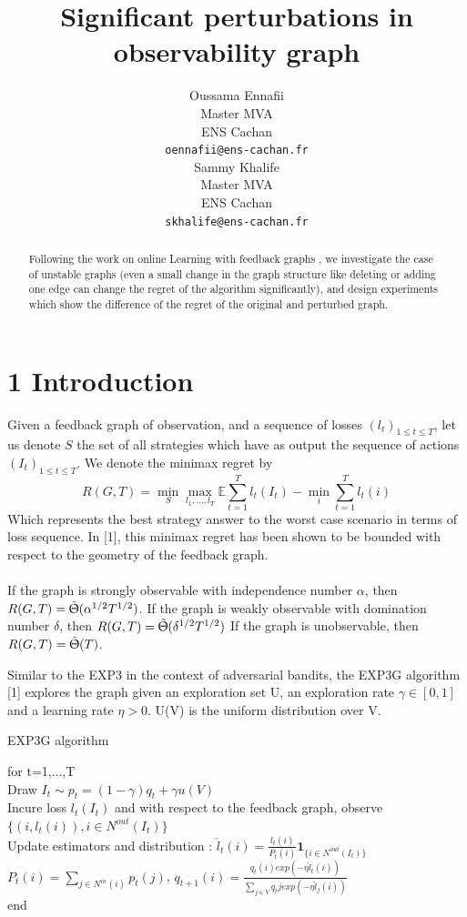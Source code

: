 \documentclass{article} %
\title{Significant perturbations in observability graph}
\author{
Oussama Ennafii\\
Master MVA\\
ENS Cachan\\
\texttt{oennafii@ens-cachan.fr} \\
\And
Sammy Khalife \\
Master MVA\\
ENS Cachan\\
\texttt{skhalife@ens-cachan.fr}
}
\begin{document}
\maketitle

\begin{abstract}
Following the work on online Learning with feedback graphs \cite{journals/corr/AlonCDK15} ,
we investigate the case of unstable graphs (even a small change in the graph structure like deleting or adding one edge can change the regret of the algorithm significantly), and design experiments which show the difference of the regret of the original and perturbed graph.
\end{abstract}

\section*{1 Introduction}
Given a feedback graph of observation, and a sequence of losses $(l_t)_{1 \leq t \leq T}$, let us denote $S$ the set of all strategies which have as output the sequence of actions $(I_t)_{1 \leq t \leq T}$. We denote the minimax regret by 
$$ R(G,T)=\min_{S} \max_{l_1,...,l_T} \mathbb{E}  \sum_{t=1}^{T} l_t(I_t) -\min_{i} \sum_{t=1}^{T}l_t(i)  $$
Which represents the best strategy answer to the worst case scenario in terms of loss sequence.
In [1], this minimax regret has been shown to be bounded with respect to the geometry of the feedback graph.~\\
~\\
If the graph is strongly observable with independence number $\alpha$, then 
$ R(G,T) = \tilde{\Uptheta}(\alpha^{1/2}T^{1/2})$.
If the graph is weakly observable with domination number $\delta$, then 
$ R(G,T) = \tilde{\Uptheta}(\delta^{1/2}T^{1/2})$
If the graph is unobservable, then 
$ R(G,T) = \tilde{\Uptheta}(T) $.

Similar to the EXP3 in the context of adversarial bandits, the EXP3G algorithm [1] explores the graph given an exploration set U, an exploration rate $\gamma \in [0,1]$ and a learning rate $\eta > 0$. U(V) is the uniform distribution over V.\\

 \FloatBarrier
 \begin{algorithm}
 	\caption{EXP3G algorithm}\label{RS}
 	for t=1,...,T ~\\
 	Draw $ I_t \sim p_t = (1-\gamma)q_t + \gamma u(V) $ ~\\
 	Incure loss $l_t(I_t)$ and with respect to the feedback graph, observe $\{(i,l_t(i)), i \in N^{out}(I_t)\}$ ~\\
 	Update estimators and distribution :
 	$\hat{l}_{t}(i)=\frac{l_t(i)}{P_{t}(i)} \textbf{1}_{\{ i \in N^{out}(I_t)\}} \qquad$ $P_t(i)=\sum_{j \in N^{in}(i)}p_{t}(j)$, 
 	$q_{t+1}(i)=\frac{q_t(i)exp(-\eta \hat{l}_{t}(i))}{\sum_{j \in V}q_t{j}exp(-\eta \hat{l}_{j}(i))}$~\\
 	end
 \end{algorithm}
 \FloatBarrier
 
\end{document}
